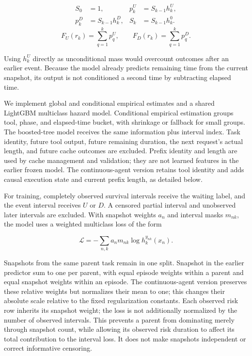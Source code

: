 \documentclass[sigconf, screen, review]{acmart}
\begin{document}
\[
\begin{aligned}
S_0&=1,& p_k^U&=S_{k-1}h_k^U,\\
p_k^D&=S_{k-1}h_k^D,& S_k&=S_{k-1}h_k^0.
\end{aligned}
\] \[
F_U(r_k)=\sum_{q=1}^{k}p_q^U,\qquad
F_D(r_k)=\sum_{q=1}^{k}p_q^D.
\]

Using \(h_k^U\) directly as unconditional mass would overcount outcomes
after an earlier event. Because the model already predicts remaining
time from the current snapshot, its output is not conditioned a second
time by subtracting elapsed time.

We implement global and conditional empirical estimates and a shared
LightGBM multiclass hazard model. Conditional empirical estimation
groups tool, phase, and elapsed-time bucket, with shrinkage or fallback
for small groups. The boosted-tree model receives the same information
plus interval index. Task identity, future tool output, future remaining
duration, the next request's actual length, and future cache outcomes
are excluded. Prefix identity and length are used by cache management
and validation; they are not learned features in the earlier frozen
model. The continuous-agent version retains tool identity and adds
causal execution state and current prefix length, as detailed below.

For training, completely observed survival intervals receive the waiting
label, and the event interval receives \(U\) or \(D\). A censored
partial interval and unobserved later intervals are excluded. With
snapshot weights \(a_n\) and interval masks \(m_{nk}\), the model uses a
weighted multiclass loss of the form

\[
\mathcal L=-\sum_{n,k}a_n m_{nk}\log h_k^{y_{nk}}(x_n).
\]

Snapshots from the same parent task remain in one split. Snapshot
in the earlier predictor sum to one per parent, with equal episode
weights within a parent and equal snapshot weights within an episode.
The continuous-agent version preserves these relative weights but
normalizes their mean to one; this changes their absolute scale relative
to the fixed regularization constants. Each observed risk
row inherits its snapshot weight; the loss is not additionally
normalized by the number of observed intervals. This prevents a parent
from dominating merely through snapshot count, while allowing its
observed risk duration to affect its total contribution to the interval
loss. It does not make snapshots independent or correct informative
censoring.
\end{document}
